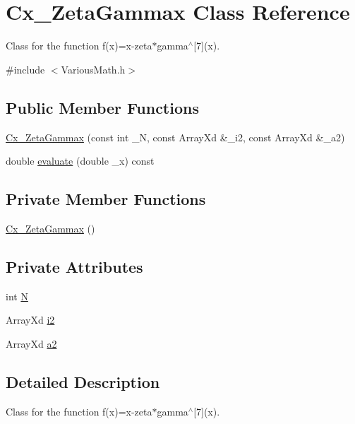 \hypertarget{class_cx___zeta_gammax}{\section{Cx\-\_\-\-Zeta\-Gammax Class Reference}
\label{class_cx___zeta_gammax}
}


Class for the function f(x)=x-\/zeta$\ast$gamma$^\wedge$\mbox{[}7\mbox{]}(x).  




{\ttfamily \#include $<$Various\-Math.\-h$>$}

\subsection*{Public Member Functions}
\begin{DoxyCompactItemize}
\item 
\hyperlink{class_cx___zeta_gammax_aaf4b1db36cb1258b57c4a3877e749890}{Cx\-\_\-\-Zeta\-Gammax} (const int \-\_\-\-N, const Array\-Xd \&\-\_\-i2, const Array\-Xd \&\-\_\-a2)
\item 
double \hyperlink{class_cx___zeta_gammax_a94a668bd73772f678d626bf92c5226e9}{evaluate} (double \-\_\-x) const 
\end{DoxyCompactItemize}
\subsection*{Private Member Functions}
\begin{DoxyCompactItemize}
\item 
\hyperlink{class_cx___zeta_gammax_ac3ff0e2d18dee4f500ba6a6747ad72f3}{Cx\-\_\-\-Zeta\-Gammax} ()
\end{DoxyCompactItemize}
\subsection*{Private Attributes}
\begin{DoxyCompactItemize}
\item 
int \hyperlink{class_cx___zeta_gammax_af0997eb0c66c70aff3b402430726caf4}{N}
\item 
Array\-Xd \hyperlink{class_cx___zeta_gammax_ad801450285e3afc4a2f733bda5cbc5c0}{i2}
\item 
Array\-Xd \hyperlink{class_cx___zeta_gammax_a7152607db9f39715b9f519f1f4e56a7e}{a2}
\end{DoxyCompactItemize}


\subsection{Detailed Description}
Class for the function f(x)=x-\/zeta$\ast$gamma$^\wedge$\mbox{[}7\mbox{]}(x). 

